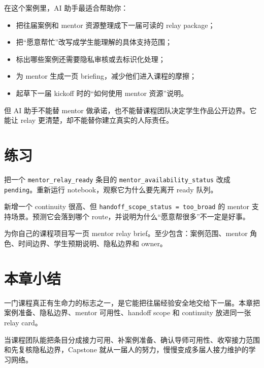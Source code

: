 在这个案例里，AI 助手最适合帮助你：

\begin{itemize}
    \item 把往届案例和 mentor 资源整理成下一届可读的 relay package；
    \item 把“愿意帮忙”改写成学生能理解的具体支持范围；
    \item 标出哪些案例还需要隐私审核或去标识化处理；
    \item 为 mentor 生成一页 briefing，减少他们进入课程的摩擦；
    \item 起草下一届 kickoff 时的“如何使用 mentor 资源”说明。
\end{itemize}

但 AI 助手不能替 mentor 做承诺，也不能替课程团队决定学生作品公开边界。它能让 relay 更清楚，却不能替你建立真实的人际责任。

\section{练习}

\begin{exercisebox}[基础练习]
把一个 \texttt{mentor\_relay\_ready} 条目的 \texttt{mentor\_availability\_status} 改成 \texttt{pending}。重新运行 notebook，观察它为什么要先离开 ready 队列。
\end{exercisebox}

\begin{exercisebox}[进阶练习]
新增一个 continuity 很高、但 \texttt{handoff\_scope\_status = too\_broad} 的 mentor 支持场景。预测它会落到哪个 route，并说明为什么“愿意帮很多”不一定是好事。
\end{exercisebox}

\begin{exercisebox}[开放练习]
为你自己的课程项目写一页 mentor relay brief。至少包含：案例范围、mentor 角色、时间边界、学生预期说明、隐私边界和 owner。
\end{exercisebox}

\section{本章小结}

一门课程真正有生命力的标志之一，是它能把往届经验安全地交给下一届。本章把案例准备、隐私边界、mentor 可用性、handoff scope 和 continuity 放进同一张 relay card。

当课程团队能把条目分成接力可用、补案例准备、确认导师可用性、收窄接力范围和先复核隐私边界，Capstone 就从一届人的努力，慢慢变成多届人接力维护的学习网络。
